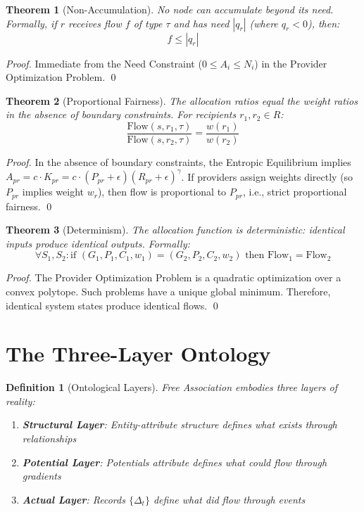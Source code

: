\documentclass[11pt]{article}
\newtheorem{definition}{Definition}
\newtheorem{theorem}{Theorem}
\begin{document}
\begin{theorem}[Non-Accumulation]
No node can accumulate beyond its need. Formally, if $r$ receives flow $f$ of type $\tau$ and has need $|q_r|$ (where $q_r < 0$), then:
\[
f \leq |q_r|
\]
\end{theorem}

\begin{proof}
Immediate from the Need Constraint ($0 \le A_i \le N_i$) in the Provider Optimization Problem. \qed
\end{proof}

\begin{theorem}[Proportional Fairness]
The allocation ratios equal the weight ratios in the absence of boundary constraints. For recipients $r_1, r_2 \in R$:
\[
\frac{\text{Flow}(s, r_1, \tau)}{\text{Flow}(s, r_2, \tau)} = \frac{w(r_1)}{w(r_2)}
\]
\end{theorem}

\begin{proof}
In the absence of boundary constraints, the Entropic Equilibrium implies $A_{pr} = c \cdot K_{pr} = c \cdot (P_{pr} + \epsilon)(R_{pr} + \epsilon)^\gamma$. If providers assign weights directly (so $P_{pr}$ implies weight $w_r$), then flow is proportional to $P_{pr}$, i.e., strict proportional fairness. \qed
\end{proof}

\begin{theorem}[Determinism]
The allocation function is deterministic: identical inputs produce identical outputs. Formally:
\[
\forall S_1, S_2: \text{if } (G_1, P_1, C_1, w_1) = (G_2, P_2, C_2, w_2) \text{ then } \text{Flow}_1 = \text{Flow}_2
\]
\end{theorem}

\begin{proof}
The Provider Optimization Problem is a quadratic optimization over a convex polytope. Such problems have a unique global minimum. Therefore, identical system states produce identical flows. \qed
\end{proof}

\section{The Three-Layer Ontology}

\begin{definition}[Ontological Layers]
Free Association embodies three layers of reality:
\begin{enumerate}
\item \textbf{Structural Layer}: Entity-attribute structure defines what exists through relationships
\item \textbf{Potential Layer}: Potentials attribute defines what \emph{could} flow through gradients
\item \textbf{Actual Layer}: Records $\{\Delta_t\}$ define what \emph{did} flow through events
\end{enumerate}
\end{definition}
\end{document}
